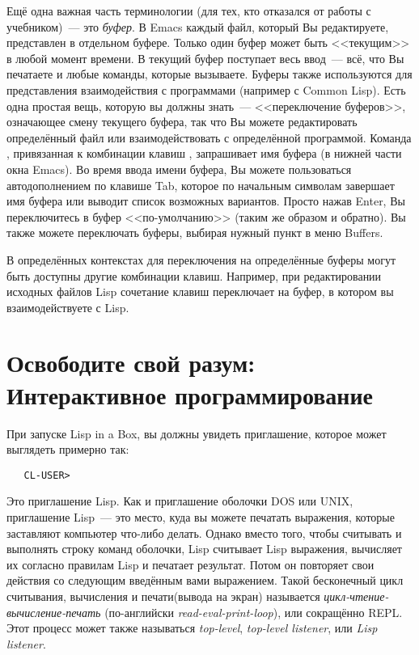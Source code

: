 Ещё одна важная часть терминологии (для тех, кто отказался от работы с учебником)~--- это
\emph{буфер}. В Emacs каждый файл, который Вы редактируете, представлен в
отдельном буфере. Только один буфер может быть <<текущим>> в любой момент времени. В текущий
буфер поступает весь ввод~--- всё, что Вы печатаете и любые команды, которые
вызываете. Буферы также используются для представления взаимодействия с программами
(например с Common Lisp). Есть одна простая вещь, которую вы должны знать~--- <<переключение
буферов>>, означающее смену текущего буфера, так что Вы можете редактировать определённый
файл или взаимодействовать с определённой программой. Команда ,
привязанная к комбинации клавиш , запрашивает имя буфера (в нижней части окна
Emacs). Во время ввода имени буфера, Вы можете пользоваться автодополнением по клавише
Tab, которое по начальным символам завершает имя буфера или выводит список возможных
вариантов. Просто нажав Enter, Вы переключитесь в буфер <<по-умолчанию>> (таким же образом и
обратно). Вы также можете переключать буферы, выбирая нужный пункт в меню Buffers.

В определённых контекстах для переключения на определённые буферы могут быть доступны
другие комбинации клавиш. Например, при редактировании исходных файлов Lisp сочетание
клавиш  переключает на буфер, в котором вы взаимодействуете с Lisp.

\section{Освободите свой разум: Интерактивное программирование}

При запуске Lisp in a Box, вы должны увидеть приглашение, которое может выглядеть примерно
так:

\begin{verbatim}
   CL-USER>
\end{verbatim}

Это приглашение Lisp. Как и приглашение оболочки DOS или UNIX, приглашение Lisp~--- это
место, куда вы можете печатать выражения, которые заставляют компьютер что-либо делать.
Однако вместо того, чтобы считывать и выполнять строку команд оболочки, Lisp
считывает Lisp выражения, вычисляет их согласно правилам Lisp и печатает результат. Потом
он повторяет свои действия со следующим введённым вами выражением. Такой бесконечный цикл
считывания, вычисления и печати(вывода на экран) называется
\emph{цикл-чтение-вычисление-печать} (по-английски \emph{read-eval-print-loop}), или
сокращённо REPL. Этот процесс может также называться \emph{top-level},
\emph{top-level listener}, или \emph{Lisp listener}.

